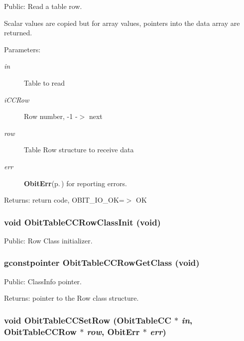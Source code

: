 Public: Read a table row. 

Scalar values are copied but for array values, pointers into the data array are returned. \begin{Desc}
\item[Parameters:]
\begin{description}
\item[{\em in}]Table to read \item[{\em i\-CCRow}]Row number, -1 -$>$ next \item[{\em row}]Table Row structure to receive data \item[{\em err}]{\bf Obit\-Err}{\rm (p.\,\pageref{structObitErr})} for reporting errors. \end{description}
\end{Desc}
\begin{Desc}
\item[Returns:]return code, OBIT\_\-IO\_\-OK=$>$ OK \end{Desc}
\subsubsection{\setlength{\rightskip}{0pt plus 5cm}void Obit\-Table\-CCRow\-Class\-Init (void)}\label{ObitTableCC_8h_a7}


Public: Row Class initializer. 

\subsubsection{\setlength{\rightskip}{0pt plus 5cm}gconstpointer Obit\-Table\-CCRow\-Get\-Class (void)}\label{ObitTableCC_8h_a9}


Public: Class\-Info pointer. 

\begin{Desc}
\item[Returns:]pointer to the Row class structure. \end{Desc}
\subsubsection{\setlength{\rightskip}{0pt plus 5cm}void Obit\-Table\-CCSet\-Row ({\bf Obit\-Table\-CC} $\ast$ {\em in}, {\bf Obit\-Table\-CCRow} $\ast$ {\em row}, {\bf Obit\-Err} $\ast$ {\em err})}\label{ObitTableCC_8h_a19}



